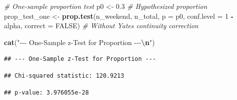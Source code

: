 \documentclass[
  12pt,
]{article}
\newenvironment{Shaded}{\begin{snugshade}}{\end{snugshade}}
\newcommand{\AttributeTok}[1]{\textcolor[rgb]{0.13,0.29,0.53}{#1}}
\newcommand{\CommentTok}[1]{\textcolor[rgb]{0.56,0.35,0.01}{\textit{#1}}}
\newcommand{\ConstantTok}[1]{\textcolor[rgb]{0.56,0.35,0.01}{#1}}
\newcommand{\DecValTok}[1]{\textcolor[rgb]{0.00,0.00,0.81}{#1}}
\newcommand{\FloatTok}[1]{\textcolor[rgb]{0.00,0.00,0.81}{#1}}
\newcommand{\FunctionTok}[1]{\textcolor[rgb]{0.13,0.29,0.53}{\textbf{#1}}}
\newcommand{\NormalTok}[1]{#1}
\newcommand{\OtherTok}[1]{\textcolor[rgb]{0.56,0.35,0.01}{#1}}
\newcommand{\SpecialCharTok}[1]{\textcolor[rgb]{0.81,0.36,0.00}{\textbf{#1}}}
\newcommand{\StringTok}[1]{\textcolor[rgb]{0.31,0.60,0.02}{#1}}
\begin{document}
\begin{Shaded}
\begin{Highlighting}[]
\CommentTok{\# One{-}sample proportion test}
\NormalTok{p0 }\OtherTok{\textless{}{-}} \FloatTok{0.3}  \CommentTok{\# Hypothesized proportion}
\NormalTok{prop\_test\_one }\OtherTok{\textless{}{-}} \FunctionTok{prop.test}\NormalTok{(n\_weekend, n\_total, }\AttributeTok{p =}\NormalTok{ p0, }\AttributeTok{conf.level =} \DecValTok{1} \SpecialCharTok{{-}}
\NormalTok{    alpha, }\AttributeTok{correct =} \ConstantTok{FALSE}\NormalTok{)  }\CommentTok{\# Without Yates continuity correction}

\FunctionTok{cat}\NormalTok{(}\StringTok{"{-}{-}{-} One{-}Sample z{-}Test for Proportion {-}{-}{-}}\SpecialCharTok{\textbackslash{}n}\StringTok{"}\NormalTok{)}
\end{Highlighting}
\end{Shaded}

\begin{verbatim}
## --- One-Sample z-Test for Proportion ---
\end{verbatim}

\begin{Shaded}
\end{Shaded}

\begin{verbatim}
## Chi-squared statistic: 120.9213
\end{verbatim}

\begin{Shaded}
\end{Shaded}

\begin{verbatim}
## p-value: 3.976055e-28
\end{verbatim}
\end{document}
